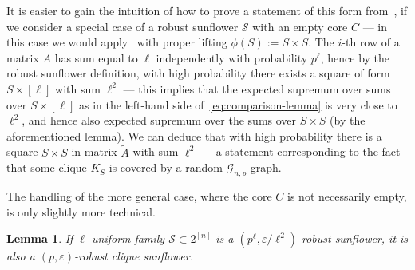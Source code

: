 \documentclass[10pt,a4paper]{article}
\newtheorem{lemma}[theorem]{Lemma}
\begin{document}
It is easier to gain the intuition of how to prove a statement of this form from~, if we consider a special case of a robust sunflower $\mathcal{S}$ with an empty core $C$ --- in this case we would apply~ with proper lifting $\phi(S) := S\times S$. The $i$-th row of a matrix $A$ has sum equal to $\ell$ independently with probability $p^\ell$, hence by the robust sunflower definition, with high probability there exists a square of form $S \times [\ell]$ with sum $\ell^2$ --- this implies that the expected supremum over sums over $S\times [\ell]$ as in the left-hand side of~\eqref{eq:comparison-lemma} is very close to $\ell^2$, and hence also expected supremum over the sums over $S\times S$ (by the aforementioned lemma). We can deduce that with high probability there is a square $S\times S$ in matrix $\tilde{A}$ with sum $\ell^2$ --- a statement corresponding to the fact that some clique $K_S$ is covered by a random $\mathcal{G}_{n,p}$ graph.

The handling of the more general case, where the core $C$ is not necessarily empty, is only slightly more technical.

\begin{lemma}
\label{lem:robust-sunflower-is-clique-sunflower}
    If $\ell$-uniform family $\mathcal{S} \subset 2^{[n]}$ is a $(p^\ell, \varepsilon/\ell^2)$-robust sunflower, it is also a $(p, \varepsilon)$-robust clique sunflower.
\end{lemma}
\end{document}
